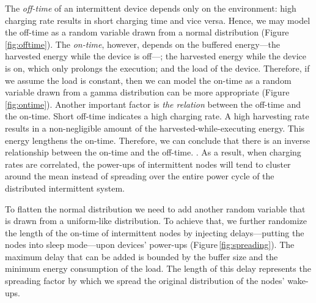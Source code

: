 The \textit{off-time} of an intermittent device depends only on the environment: high charging rate results in short charging time and vice versa. Hence, we may model the off-time as a random variable drawn from a normal distribution (Figure\,\ref{fig:offtime}). The \textit{on-time}, however, depends on the buffered energy---the harvested energy while the device is off---; the harvested energy while the device is on, which only prolongs the execution; and the load of the device. Therefore, if we assume the load is constant, then we can model the on-time as a random variable drawn from a gamma distribution can be more appropriate (Figure\,\ref{fig:ontime}). Another important factor is \textit{the relation} between the off-time and the on-time. Short off-time indicates a high charging rate. A high harvesting rate results in a non-negligible amount of the harvested-while-executing energy. This energy lengthens the on-time. Therefore, we can conclude that there is an inverse relationship between the on-time and the off-time. . As a result, when charging rates are correlated, the power-ups of intermittent nodes will tend to cluster around the mean instead of spreading over the entire power cycle of the distributed intermittent system. 

To flatten the normal distribution we need to add another random variable that is drawn from a uniform-like distribution. To achieve that, we further randomize the length of the on-time of intermittent nodes by injecting delays---putting the nodes into sleep mode---upon devices' power-ups (Figure\,\ref{fig:spreading}). The maximum delay that can be added is bounded by the buffer size and the minimum energy consumption of the load. The length of this delay represents the spreading factor by which we spread the original distribution of the nodes' wake-ups.  



